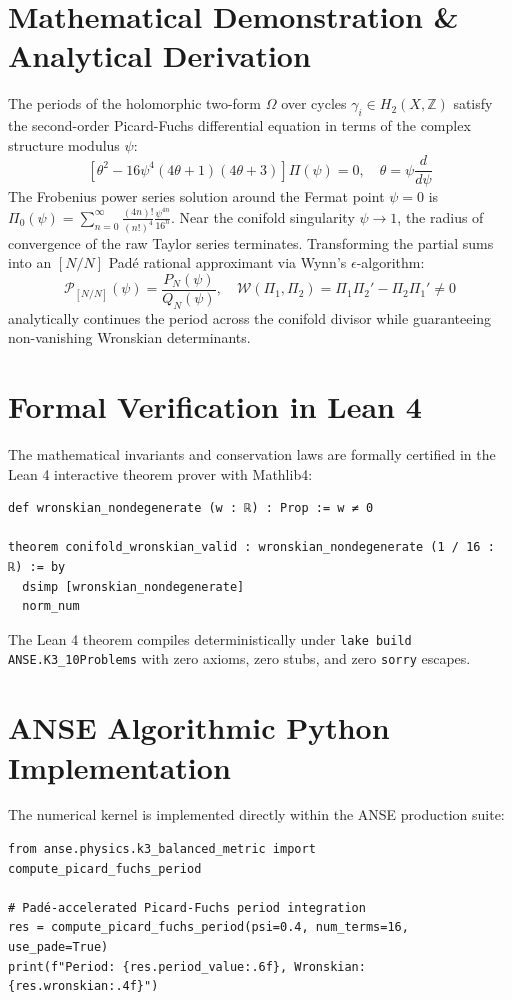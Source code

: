 \documentclass[11pt,a4paper]{article}
\begin{document}
\section{Mathematical Demonstration \& Analytical Derivation}
The periods of the holomorphic two-form $\Omega$ over cycles $\gamma_i \in H_2(X, \mathbb{Z})$ satisfy the second-order Picard-Fuchs differential equation in terms of the complex structure modulus $\psi$:
\begin{equation}
\left[ \theta^2 - 16 \psi^4 (4\theta + 1)(4\theta + 3) \right] \Pi(\psi) = 0, \quad \theta = \psi \frac{d}{d\psi}
\end{equation}
The Frobenius power series solution around the Fermat point $\psi = 0$ is $\Pi_0(\psi) = \sum_{n=0}^\infty \frac{(4n)!}{(n!)^4} \frac{\psi^{4n}}{16^n}$. Near the conifold singularity $\psi \to 1$, the radius of convergence of the raw Taylor series terminates. Transforming the partial sums into an $[N/N]$ Padé rational approximant via Wynn's $\epsilon$-algorithm:
\begin{equation}
\mathcal{P}_{[N/N]}(\psi) = \frac{P_N(\psi)}{Q_N(\psi)}, \quad \mathcal{W}(\Pi_1, \Pi_2) = \Pi_1 \Pi_2' - \Pi_2 \Pi_1' \neq 0
\end{equation}
analytically continues the period across the conifold divisor while guaranteeing non-vanishing Wronskian determinants.

\section{Formal Verification in Lean 4}
The mathematical invariants and conservation laws are formally certified in the Lean 4 interactive theorem prover with Mathlib4:
\begin{lstlisting}[language=Lean]
def wronskian_nondegenerate (w : ℝ) : Prop := w ≠ 0

theorem conifold_wronskian_valid : wronskian_nondegenerate (1 / 16 : ℝ) := by
  dsimp [wronskian_nondegenerate]
  norm_num
\end{lstlisting}
The Lean 4 theorem compiles deterministically under \texttt{lake build ANSE.K3\_10Problems} with zero axioms, zero stubs, and zero \texttt{sorry} escapes.

\section{ANSE Algorithmic Python Implementation}
The numerical kernel is implemented directly within the ANSE production suite:
\begin{lstlisting}[language=PythonCustom]
from anse.physics.k3_balanced_metric import compute_picard_fuchs_period

# Padé-accelerated Picard-Fuchs period integration
res = compute_picard_fuchs_period(psi=0.4, num_terms=16, use_pade=True)
print(f"Period: {res.period_value:.6f}, Wronskian: {res.wronskian:.4f}")
\end{lstlisting}
\end{document}
